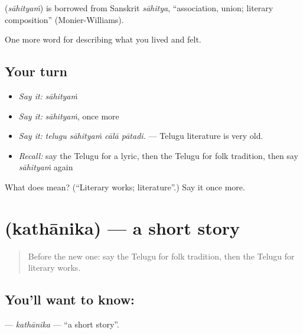\begin{cousinweb}
\textbf{} (\emph{sāhityaṁ}) is borrowed from Sanskrit \emph{sāhitya}, \textquotedblleft{}association, union; literary composition\textquotedblright{} (Monier-Williams).
\end{cousinweb}

\begin{grammarlens}[title={What you've built}]
One more word for describing what you lived and felt.
\end{grammarlens}

\subsection*{Your turn}
\begin{itemize}
\raggedright
  \item \emph{Say it:} \emph{sāhityaṁ}
  \item \emph{Say it:} \emph{sāhityaṁ}, once more
  \item \emph{Say it:} \emph{telugu sāhityaṁ cālā pātadi.} — Telugu literature is very old.
  \item \emph{Recall:} say the Telugu for a lyric, then the Telugu for folk tradition, then say \emph{sāhityaṁ} again
\end{itemize}

\begin{tcolorbox}[breakable,colback=teal!4,colframe=teal!35!black,title={Before you move on}]
What does  mean? (\textquotedblleft{}Literary works; literature\textquotedblright{}.) Say it once more.
\end{tcolorbox}
\section[\texorpdfstring{\te{కథానిక} (kathānika)}{కథానిక (kathānika)}]{ (kathānika) — a short story}

\label{lesson:TE-C540-kathanika}



\begin{quote}
Before the new one: say the Telugu for folk tradition, then the Telugu for literary works.
\end{quote}

\subsection*{You'll want to know: }
\textbf{} — \emph{kathānika} — \textquotedblleft{}a short story\textquotedblright{}.

